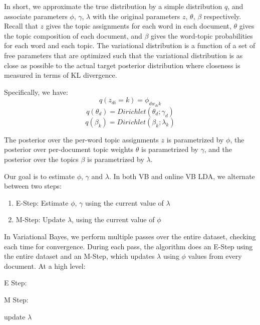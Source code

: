 \documentclass[12pt]{report}
\begin{document}
In short, we approximate the true distribution by a simple
distribution $q$, and associate parameters $\phi$, $\gamma$, $\lambda$
with the original parameters $z$, $\theta$, $\beta$ respectively.
Recall that $z$ gives the topic assignments for each word in each
document, $\theta$ gives the topic composition of each document, and
$\beta$ gives the word-topic probabilities for each word and each
topic. The variational distribution is a function of a set of free
parameters that are optimized such that the variational distribution
is as close as possible to the actual target posterior distribution
where closeness is measured in terms of KL divergence.

Specifically, we have:
\begin{equation}
q(z_{di}=k) = \phi_{dw_{di}k}
\end{equation}
\begin{equation}
q(\theta_{d}) = Dirichlet(\theta_{d}; \gamma_{d})
\end{equation}
\begin{equation}
q(\beta_{k}) = Dirichlet(\beta_{k}; \lambda_{k})
\end{equation}

The posterior over the per-word topic assignments $z$ is parametrized by
$\phi$, the posterior over per-document topic weights $\theta$ is parametrized
by $\gamma$, and the posterior over the topics $\beta$ is parametrized by
$\lambda$. 

Our goal is to estimate $\phi$, $\gamma$ and $\lambda$. In both VB and 
online VB LDA, we alternate between two steps:
\begin{enumerate}
\item E-Step: Estimate $\phi$, $\gamma$ using the current value of $\lambda$
\item M-Step: Update $\lambda$, using the current value of $\phi$
\end{enumerate}

In Variational Bayes, we perform multiple passes over the entire dataset, 
checking each time for convergence. During each pass, the algorithm does an 
E-Step using the entire dataset and an M-Step, which updates $\lambda$ using 
$\phi$ values from every document. At a high level:

\begin{algorithm}
\SetAlgoNoLine
E Step:

M Step:

update $\lambda$
\end{algorithm}
\end{document}
